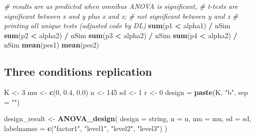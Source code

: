 \documentclass[]{book}
\newenvironment{Shaded}{\begin{snugshade}}{\end{snugshade}}
\newcommand{\CommentTok}[1]{\textcolor[rgb]{0.56,0.35,0.01}{\textit{#1}}}
\newcommand{\DataTypeTok}[1]{\textcolor[rgb]{0.13,0.29,0.53}{#1}}
\newcommand{\DecValTok}[1]{\textcolor[rgb]{0.00,0.00,0.81}{#1}}
\newcommand{\FloatTok}[1]{\textcolor[rgb]{0.00,0.00,0.81}{#1}}
\newcommand{\KeywordTok}[1]{\textcolor[rgb]{0.13,0.29,0.53}{\textbf{#1}}}
\newcommand{\NormalTok}[1]{#1}
\newcommand{\OperatorTok}[1]{\textcolor[rgb]{0.81,0.36,0.00}{\textbf{#1}}}
\newcommand{\StringTok}[1]{\textcolor[rgb]{0.31,0.60,0.02}{#1}}
\begin{document}
\begin{Shaded}
\begin{Highlighting}[]
\CommentTok{# results are as predicted when omnibus ANOVA is significant, }
\CommentTok{# t-tests are significant between x and y plus x and z; }
\CommentTok{# not significant between y and z}
\CommentTok{# printing all unique tests (adjusted code by DL)}
\KeywordTok{sum}\NormalTok{(p1 }\OperatorTok{<}\StringTok{ }\NormalTok{alpha1) }\OperatorTok{/}\StringTok{ }\NormalTok{nSim}
\KeywordTok{sum}\NormalTok{(p2 }\OperatorTok{<}\StringTok{ }\NormalTok{alpha2) }\OperatorTok{/}\StringTok{ }\NormalTok{nSim}
\KeywordTok{sum}\NormalTok{(p3 }\OperatorTok{<}\StringTok{ }\NormalTok{alpha2) }\OperatorTok{/}\StringTok{ }\NormalTok{nSim}
\KeywordTok{sum}\NormalTok{(p4 }\OperatorTok{<}\StringTok{ }\NormalTok{alpha2) }\OperatorTok{/}\StringTok{ }\NormalTok{nSim}
\KeywordTok{mean}\NormalTok{(pes1)}
\KeywordTok{mean}\NormalTok{(pes2)}
\end{Highlighting}
\end{Shaded}

\hypertarget{three-conditions-replication-1}{%
\subsection{Three conditions replication}\label{three-conditions-replication-1}}

\begin{Shaded}
\begin{Highlighting}[]
\NormalTok{K <-}\StringTok{ }\DecValTok{3}
\NormalTok{mu <-}\StringTok{ }\KeywordTok{c}\NormalTok{(}\DecValTok{0}\NormalTok{, }\FloatTok{0.4}\NormalTok{, }\FloatTok{0.0}\NormalTok{)}
\NormalTok{n <-}\StringTok{ }\DecValTok{145}
\NormalTok{sd <-}\StringTok{ }\DecValTok{1}
\NormalTok{r <-}\StringTok{ }\DecValTok{0}
\NormalTok{design =}\StringTok{ }\KeywordTok{paste}\NormalTok{(K, }\StringTok{"b"}\NormalTok{, }\DataTypeTok{sep =} \StringTok{""}\NormalTok{)}
\end{Highlighting}
\end{Shaded}

\begin{Shaded}
\begin{Highlighting}[]
\NormalTok{design_result <-}\StringTok{ }\KeywordTok{ANOVA_design}\NormalTok{(}
  \DataTypeTok{design =}\NormalTok{ string,}
  \DataTypeTok{n =}\NormalTok{ n,}
  \DataTypeTok{mu =}\NormalTok{ mu,}
  \DataTypeTok{sd =}\NormalTok{ sd,}
  \DataTypeTok{labelnames =} \KeywordTok{c}\NormalTok{(}\StringTok{"factor1"}\NormalTok{, }\StringTok{"level1"}\NormalTok{, }\StringTok{"level2"}\NormalTok{, }\StringTok{"level3"}\NormalTok{)}
\NormalTok{  )}
\end{Highlighting}
\end{Shaded}
\end{document}
